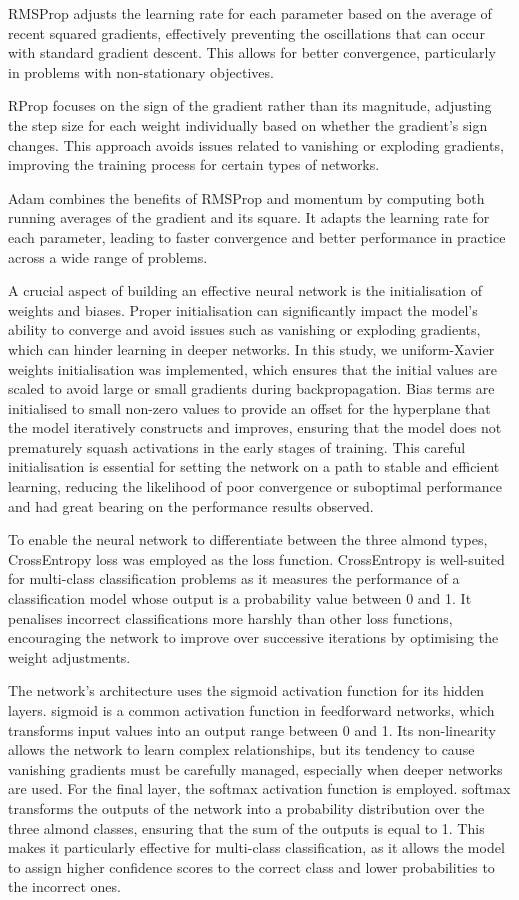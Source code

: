 RMSProp adjusts the learning rate for each parameter based on the average of 
recent squared gradients, effectively preventing the oscillations that can occur with standard gradient descent. 
This allows for better convergence, particularly in problems with non-stationary objectives.

RProp focuses on the sign of the gradient rather than its magnitude, adjusting the 
step size for each weight individually based on whether the gradient's sign changes. This approach avoids issues 
related to vanishing or exploding gradients, improving the training process for certain types of networks.

Adam combines the benefits of RMSProp and momentum by computing both running 
averages of the gradient and its square. It adapts the learning rate for each parameter, leading to faster 
convergence and better performance in practice across a wide range of problems.

A crucial aspect of building an effective neural network is the initialisation of weights and biases. 
Proper initialisation can significantly impact the model’s ability to converge and avoid issues such 
as vanishing or exploding gradients, which can hinder learning in deeper networks. In this study, we 
uniform-Xavier weights initialisation was implemented, which ensures that the initial values are scaled to avoid 
large or small gradients during backpropagation. Bias terms are initialised to small non-zero values to 
provide an offset for the hyperplane that the model iteratively constructs and improves, ensuring that 
the model does not prematurely squash activations in the early stages 
of training. This careful initialisation is essential for setting the network on a path to stable and 
efficient learning, reducing the likelihood of poor convergence or suboptimal performance and had great bearing on the
performance results observed.

To enable the neural network to differentiate between the three almond types, CrossEntropy loss was employed 
as the loss function. CrossEntropy is well-suited for multi-class classification problems 
as it measures the performance of a classification model whose output is a probability value between 0 and 1. 
It penalises incorrect classifications more harshly than other loss functions, encouraging the network to 
improve over successive iterations by optimising the weight adjustments.

The network's architecture uses the sigmoid activation function for its hidden layers. sigmoid is a common 
activation function in feedforward networks, which transforms input values into an output range between 0 
and 1. Its non-linearity allows the network to learn complex relationships, but its tendency to cause 
vanishing gradients must be carefully managed, especially when deeper networks are used. For the final 
layer, the softmax activation function is employed. softmax transforms the outputs of the network into 
a probability distribution over the three almond classes, ensuring that the sum of the outputs is equal 
to 1. This makes it particularly effective for multi-class classification, as it allows the model to assign 
higher confidence scores to the correct class and lower probabilities to the incorrect ones.


